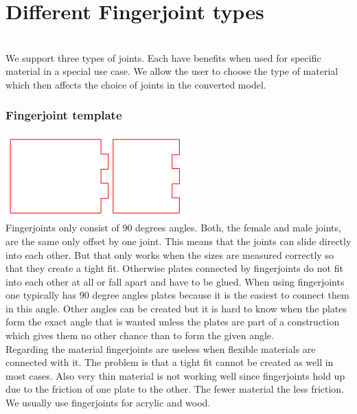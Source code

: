 \documentclass[../ClassicThesis.tex]{subfiles}
\begin{document}
\section{Different Fingerjoint types}

\\
We support three types of joints. Each have benefits when used for specific material in a special use case. We allow the user to choose the type of material which then affects the choice of joints in the converted model.
\subsubsection{Fingerjoint template}
\includegraphics[width=0.5\columnwidth]{Images/fingerjoints.png}\\
Fingerjoints only consist of 90 degrees angles. Both, the female and male joints, are the same only offset by one joint. This means that the joints can slide directly into each other. But that only works when the sizes are measured correctly so that they create a tight fit. Otherwise plates connected by fingerjoints do not fit into each other at all or fall apart and have to be glued. 
When using fingerjoints one typically has 90 degree angles plates because it is the easiest to connect them in this angle. Other angles can be created but it is hard to know when the plates form the exact angle that is wanted unless the plates are part of a construction which gives them no other chance than to form the given angle.\\
Regarding the material fingerjoints are useless when flexible materials are connected with it. The problem is that a tight fit cannot be created as well in most cases. Also very thin material is not working well since fingerjoints hold up due to the friction of one plate to the other. The fewer material the less friction.\\
We usually use fingerjoints for acrylic and wood.
\end{document}
